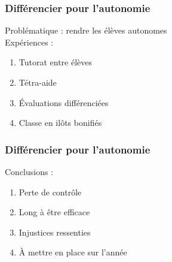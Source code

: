 
\begin{frame}
    \frametitle{Différencier pour l'autonomie}
    Problématique : rendre les élèves autonomes\\
    Expériences :
    \begin{enumerate}
        \item Tutorat entre élèves
        \item Tétra-aide
        \item Évaluations différenciées
        \item Classe en ilôts bonifiés
    \end{enumerate}
\end{frame}

\begin{frame}
    \frametitle{Différencier pour l'autonomie}
    Conclusions :
    \begin{enumerate}
        \item Perte de contrôle
        \item Long à être efficace
        \item Injustices ressenties
        \item À mettre en place sur l'année
    \end{enumerate}
\end{frame}
